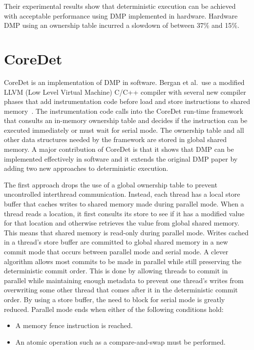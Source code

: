 Their experimental results show that deterministic execution can be
achieved with acceptable performance using DMP implemented in
hardware.  Hardware DMP using an ownership table incurred a slowdown
of between 37\% and 15\%.

\section{CoreDet}

CoreDet is an implementation of DMP in software.  Bergan et al.\ use a
modified LLVM (Low Level Virtual Machine) C/C++ compiler with several
new compiler phases that add instrumentation code before load and
store instructions to shared memory~\cite{coredet}.  The
instrumentation code calls into the CoreDet run-time framework that
consults an in-memory ownership table and decides if the instruction
can be executed immediately or must wait for serial mode.  The
ownership table and all other data structures needed by the framework
are stored in global shared memory.  A major contribution of CoreDet
is that it shows that DMP can be implemented effectively in software
and it extends the original DMP paper by adding two new approaches to
deterministic execution.

The first approach drops the use of a global ownership table to
prevent uncontrolled interthread communication.  Instead, each thread
has a local store buffer that caches writes to shared memory made
during parallel mode.  When a thread reads a location, it first
consults its store to see if it has a modified value for that location
and otherwise retrieves the value from global shared memory.  This
means that shared memory is read-only during parallel mode.  Writes
cached in a thread's store buffer are committed to global shared
memory in a new commit mode that occurs between parallel mode and
serial mode.  A clever algorithm allows most commits to be made in
parallel while still preserving the deterministic commit order.  This
is done by allowing threads to commit in parallel while maintaining
enough metadata to prevent one thread's writes from overwriting some
other thread that comes after it in the deterministic commit order.
By using a store buffer, the need to block for serial mode is greatly
reduced.  Parallel mode ends when either of the following conditions
hold:

\begin{itemize}
\item A memory fence instruction is reached.

\item An atomic operation such as a compare-and-swap must be
  performed.
\end{itemize}

